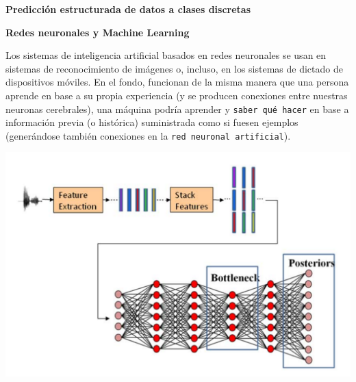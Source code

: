 \documentclass[11pt]{beamer}
\begin{document}
\begin{frame}{\textbf{\textcolor{green!55!red}{Predicci\'on estructurada de datos a clases discretas}}}
	
\textbf{Redes neuronales y Machine Learning}

\scriptsize{Los sistemas de inteligencia artificial basados en redes neuronales se usan en sistemas de reconocimiento de im\'agenes o, incluso, en los sistemas de dictado de  dispositivos m\'oviles. En el fondo, funcionan de la misma manera que una persona aprende en base a su propia experiencia (y se producen conexiones entre nuestras neuronas cerebrales), una m\'aquina podr\'ia aprender y \texttt{saber qu\'e hacer}  en base a informaci\'on previa (o hist\'orica) suministrada como si fuesen ejemplos (gener\'andose tambi\'en conexiones en la \texttt{red neuronal artificial}).}

\begin{center}
	\includegraphics[width=0.6 \textwidth]{ML17.png}	
\end{center}
\end{frame}
\end{document}
